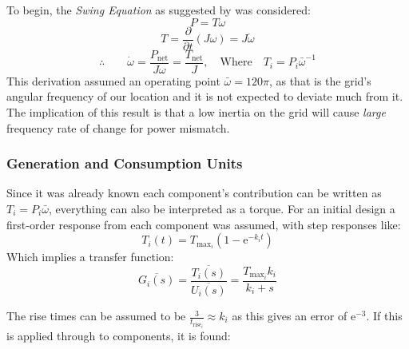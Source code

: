 To begin, the \emph{Swing Equation} as suggested by \cite{power:swing} was considered:
%
\begin{equation}
    P = T\omega
\end{equation}
%
\begin{equation}
        T = \frac{\partial}{\partial t} ( J \omega) = J \dot \omega
        \label{swing}
\end{equation}
%
\begin{equation}
        \therefore \qquad \dot \omega = \frac{P_{\text{net}}}{J \omega} = \frac{T_{\text{net}}}{J}, \quad \text{Where} \quad  T_i = P_i \bar \omega^{-1}
\end{equation}
%
This derivation assumed an operating point $\bar \omega = 120\pi$, as that is the grid's angular frequency of our location and it is not expected to deviate much from it.
The implication of this result is that a low inertia on the grid will cause \emph{large} frequency rate of change for power mismatch.

\subsubsection{Generation and Consumption Units}

Since it was already known each component's contribution can be written as $T_i = P_i \bar \omega$, everything can also be interpreted as a torque.
For an initial design a first-order response from each component was assumed, with step responses like:
\begin{equation}
        T_i(t) = T_{\text{max}_i}(1 - \mathrm{e}^{-k_i t})
\end{equation}
Which implies a transfer function:
\begin{equation}
        \overline{G_{i}(s)} = \frac{\overline{T_{i}(s)}}{\overline{U_{i}(s)}} = \frac{T_{\text{max}_{i}}k_i}{k_i + {s}}
\end{equation}

The rise times can be assumed to be $\frac{3}{t_{\text{rise}_i}} \approx k_i$ as this gives an error of $\mathrm{e}^{-3}$. If this is applied through to components, it is found:


